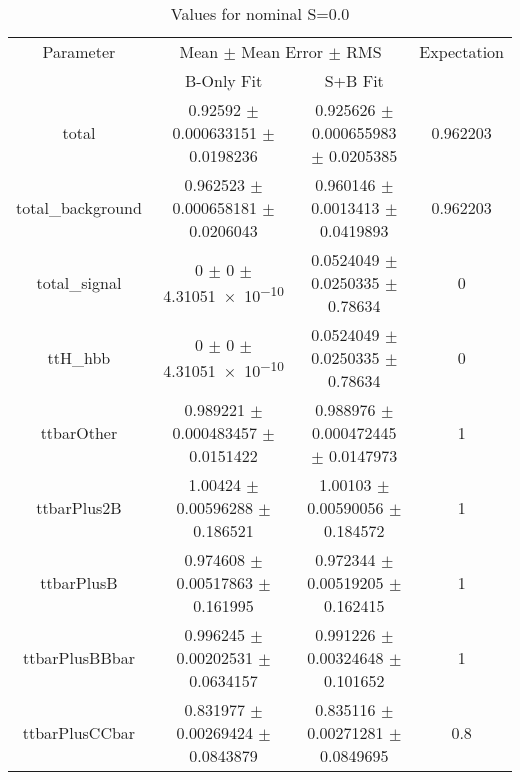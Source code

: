 \begin{table}
\centering
\caption{Values for nominal S=0.0}
\begin{tabular}{cccc}
\toprule
Parameter & \multicolumn{2}{c}{Mean $\pm$ Mean Error $\pm$ RMS} & Expectation\\
 & B-Only Fit & S+B Fit & \\
\midrule
total & \num{0.92592} $\pm$ \num{0.000633151} $\pm$ \num{0.0198236} & \num{0.925626} $\pm$ \num{0.000655983} $\pm$ \num{0.0205385} & \num{0.962203}\\
total\_background & \num{0.962523} $\pm$ \num{0.000658181} $\pm$ \num{0.0206043} & \num{0.960146} $\pm$ \num{0.0013413} $\pm$ \num{0.0419893} & \num{0.962203}\\
total\_signal & \num{0} $\pm$ \num{0} $\pm$ \num{4.31051e-10} & \num{0.0524049} $\pm$ \num{0.0250335} $\pm$ \num{0.78634} & \num{0}\\
ttH\_hbb & \num{0} $\pm$ \num{0} $\pm$ \num{4.31051e-10} & \num{0.0524049} $\pm$ \num{0.0250335} $\pm$ \num{0.78634} & \num{0}\\
ttbarOther & \num{0.989221} $\pm$ \num{0.000483457} $\pm$ \num{0.0151422} & \num{0.988976} $\pm$ \num{0.000472445} $\pm$ \num{0.0147973} & \num{1}\\
ttbarPlus2B & \num{1.00424} $\pm$ \num{0.00596288} $\pm$ \num{0.186521} & \num{1.00103} $\pm$ \num{0.00590056} $\pm$ \num{0.184572} & \num{1}\\
ttbarPlusB & \num{0.974608} $\pm$ \num{0.00517863} $\pm$ \num{0.161995} & \num{0.972344} $\pm$ \num{0.00519205} $\pm$ \num{0.162415} & \num{1}\\
ttbarPlusBBbar & \num{0.996245} $\pm$ \num{0.00202531} $\pm$ \num{0.0634157} & \num{0.991226} $\pm$ \num{0.00324648} $\pm$ \num{0.101652} & \num{1}\\
ttbarPlusCCbar & \num{0.831977} $\pm$ \num{0.00269424} $\pm$ \num{0.0843879} & \num{0.835116} $\pm$ \num{0.00271281} $\pm$ \num{0.0849695} & \num{0.8}\\
\bottomrule
\end{tabular}
\end{table}